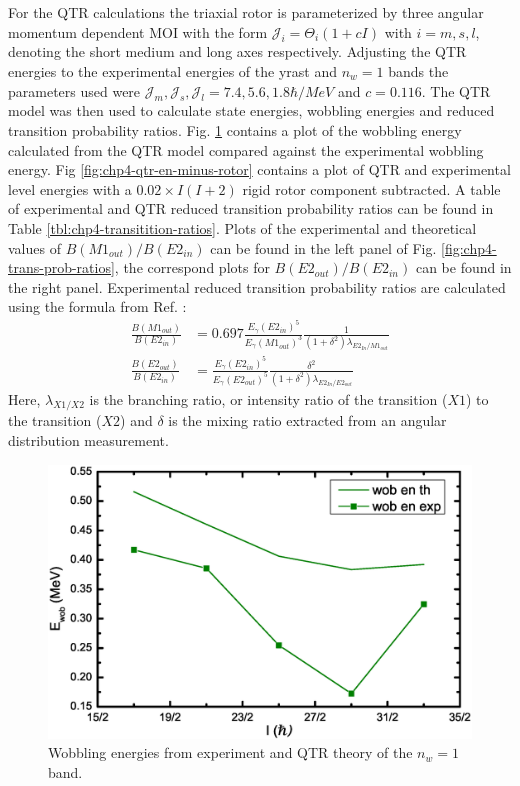 For the QTR calculations the triaxial rotor is parameterized by three angular momentum dependent MOI with the form $\mathcal{J}_i=\Theta_i(1+cI)$ with $i=m,s,l$, denoting the short medium and long axes respectively. Adjusting the QTR energies to the experimental energies of the yrast and $n_w=1$ bands the parameters used were $\mathcal{J}_m,\mathcal{J}_s,\mathcal{J}_l = 7.4, 5.6, 1.8 \hbar{}/MeV$ and $c=0.116$. The QTR model was then used to calculate state energies, wobbling energies and reduced transition probability ratios. Fig. \ref{fig:chp4-wobb-en} contains a plot of the wobbling energy calculated from the QTR model compared against the experimental wobbling energy. Fig \ref{fig:chp4-qtr-en-minus-rotor} contains a plot of QTR and experimental level energies with a $0.02\times{}I(I+2)$ rigid rotor component subtracted. A table of experimental and QTR reduced transition probability ratios can be found in Table \ref{tbl:chp4-transitition-ratios}. Plots of the experimental and theoretical values of $B(M1_{out})/B(E2_{in})$ can be found in the left panel of Fig. \ref{fig:chp4-trans-prob-ratios}, the correspond plots for $B(E2_{out})/B(E2_{in})$ can be found in the right panel. Experimental reduced transition probability ratios are calculated using the formula from Ref. \cite{exoticNuclearExcitations}:
\begin{align}
\label{eqn:chp4-red-trans-prob-ratios}
\frac{B(M1_{out})}{B(E2_{in})} &= 0.697 \frac{E_{\gamma}(E2_{in})^5}{E_{\gamma}(M1_{out})^3}\frac{1}{(1+\delta^2)\lambda{}_{E2_{In}/M1_{out}}}\\
\frac{B(E2_{out})}{B(E2_{in})} &= \frac{E_{\gamma}(E2_{in})^5}{E_{\gamma}(E2_{out})^5}\frac{\delta^2}{(1+\delta^2)\lambda{}_{E2_{In}/E2_{out}}}
\end{align}
Here, $\lambda{}_{X1/X2}$ is the branching ratio, or intensity ratio of the transition ($X1$) to the transition ($X2$) and $\delta$ is the mixing ratio extracted from an angular distribution measurement.

\begin{figure}[t!]
\centerline{\includegraphics[width=\textwidth]{./img/c4/wob_en.eps}}
	\caption{Wobbling energies from experiment and QTR theory of the $n_w=1$ band.\label{fig:chp4-wobb-en}}
\end{figure}

